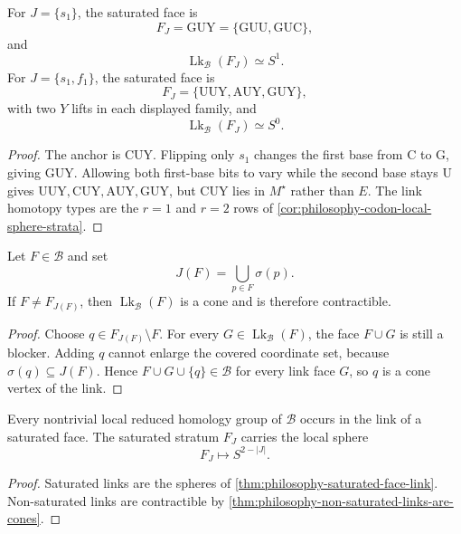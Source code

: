 \begin{corollary}
\label{cor:philosophy-local-link-coordinate-examples}
For $J=\{s_{1}\}$, the saturated face is
$$
  F_{J}=\mathrm{GUY}=\{\mathrm{GUU},\mathrm{GUC}\},
$$
and
$$
  \operatorname{Lk}_{\mathcal{B}}(F_{J})\simeq S^{1}.
$$
For $J=\{s_{1},f_{1}\}$, the saturated face is
$$
  F_{J}
  =
  \{\mathrm{UUY},\mathrm{AUY},\mathrm{GUY}\},
$$
with two $Y$ lifts in each displayed family, and
$$
  \operatorname{Lk}_{\mathcal{B}}(F_{J})\simeq S^{0}.
$$
\end{corollary}
\begin{proof}
The anchor is $\mathrm{CUY}$. Flipping only $s_{1}$ changes the first
base from $\mathrm{C}$ to $\mathrm{G}$, giving $\mathrm{GUY}$. Allowing
both first-base bits to vary while the second base stays $\mathrm{U}$
gives $\mathrm{UUY},\mathrm{CUY},\mathrm{AUY},\mathrm{GUY}$, but
$\mathrm{CUY}$ lies in $M^{\star}$ rather than $E$. The link homotopy
types are the $r=1$ and $r=2$ rows of
\autoref{cor:philosophy-codon-local-sphere-strata}.
\end{proof}

\begin{theorem}
\label{thm:philosophy-non-saturated-links-are-cones}
Let $F\in\mathcal{B}$ and set
$$
  J(F)=\bigcup_{p\in F}\sigma(p).
$$
If $F\neq F_{J(F)}$, then
$\operatorname{Lk}_{\mathcal{B}}(F)$ is a cone and is therefore
contractible.
\end{theorem}
\begin{proof}
Choose $q\in F_{J(F)}\setminus F$. For every
$G\in\operatorname{Lk}_{\mathcal{B}}(F)$, the face
$F\cup G$ is still a blocker. Adding $q$ cannot enlarge the covered
coordinate set, because $\sigma(q)\subseteq J(F)$. Hence
$F\cup G\cup\{q\}\in\mathcal{B}$ for every link face $G$, so $q$ is a
cone vertex of the link.
\end{proof}

\begin{corollary}
\label{cor:philosophy-local-obstruction-support}
Every nontrivial local reduced homology group of $\mathcal{B}$ occurs
in the link of a saturated face. The saturated stratum $F_{J}$ carries
the local sphere
$$
  F_{J}\longmapsto S^{2-|J|}.
$$
\end{corollary}
\begin{proof}
Saturated links are the spheres of
\autoref{thm:philosophy-saturated-face-link}. Non-saturated links are
contractible by \autoref{thm:philosophy-non-saturated-links-are-cones}.
\end{proof}

